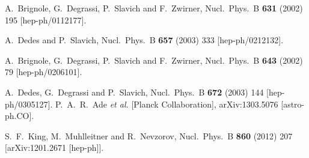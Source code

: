 \documentclass[12pt,a4paper]{article}
\begin{document}
\begin{thebibliography}{999}
  A.~Brignole, G.~Degrassi, P.~Slavich and F.~Zwirner,
  Nucl.\ Phys.\ B {\bf 631} (2002) 195
  [hep-ph/0112177].

  A.~Dedes and P.~Slavich,
  Nucl.\ Phys.\ B {\bf 657} (2003) 333
  [hep-ph/0212132].

  A.~Brignole, G.~Degrassi, P.~Slavich and F.~Zwirner,
  Nucl.\ Phys.\ B {\bf 643} (2002) 79
  [hep-ph/0206101].

  A.~Dedes, G.~Degrassi and P.~Slavich,
  Nucl.\ Phys.\ B {\bf 672} (2003) 144
  [hep-ph/0305127].
P.~A.~R.~Ade {\it et al.}  [Planck Collaboration],
arXiv:1303.5076 [astro-ph.CO].

S.~F.~King, M.~Muhlleitner and R.~Nevzorov,
Nucl.\ Phys.\ B {\bf 860} (2012) 207
[arXiv:1201.2671 [hep-ph]].

\end{thebibliography}
\end{document}
